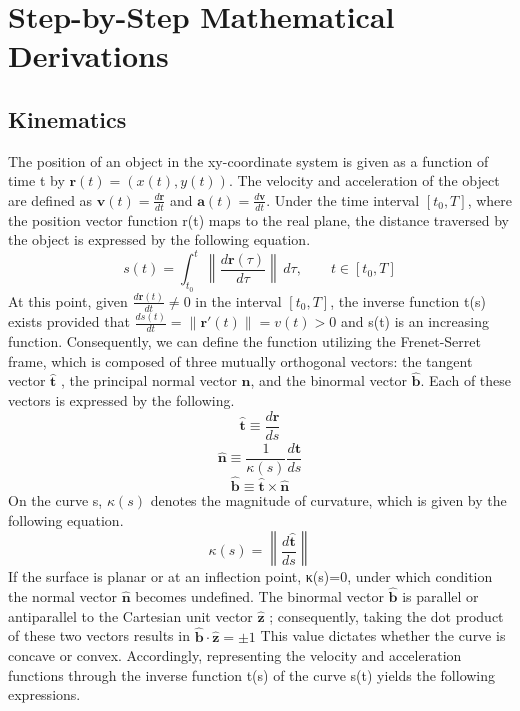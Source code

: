\documentclass[11pt,letterpaper]{article}
\begin{document}
\section{Step-by-Step Mathematical Derivations}
\subsection{Kinematics}
The position of an object in the xy-coordinate system is given as a function of time t by $\mathbf r(t)=(x(t),y(t))$. The velocity and acceleration of the object are defined as $\mathbf v(t)=\frac{d\mathbf r}{dt}$ and $\mathbf a(t)=\frac{d\mathbf v}{dt}$. Under the time interval $[t_0,T]$, where the position vector function r(t) maps to the real plane, the distance traversed by the object is expressed by the following equation.
\begin{equation}
s(t)
=
\int_{t_0}^{t}
\left\|
\frac{d\mathbf r(\tau)}{d\tau}
\right\|
\,d\tau,
\qquad
t\in[t_0,T]
\tag{1}
\end{equation}
At this point, given $\frac{d\mathbf r(t)}{dt}\neq0$ in the interval $[t_0,T]$, the inverse function t(s) exists provided that $\frac{ds(t)}{dt}=\left\|\mathbf r'(t)\right\|=v(t)>0$ and s(t) is an increasing function. Consequently, we can define the function utilizing the Frenet-Serret frame, which is composed of three mutually orthogonal vectors: the tangent vector $\hat{\mathbf t}$ , the principal normal vector $\hat{\mathbf n}$, and the binormal vector $\hat{\mathbf b}$. Each of these vectors is expressed by the following.
\begin{equation}
\hat{\mathbf t}
\equiv
\frac{d\mathbf r}{ds}
\tag{2a}
\end{equation} \begin{equation}
\hat{\mathbf n}
\equiv
\frac{1}{\kappa(s)}
\frac{d\hat{\mathbf t}}{ds}
\tag{2b}
\end{equation} \begin{equation}
\hat{\mathbf b}
\equiv
\hat{\mathbf t}\times\hat{\mathbf n}
\tag{2c}
\end{equation} On the curve s, $\kappa(s)$ denotes the magnitude of curvature, which is given by the following equation. \[
\kappa(s)
=
\left\|
\frac{d\hat{\mathbf t}}{ds}
\right\|
\] If the surface is planar or at an inflection point, κ(s)=0, under which condition the normal vector $\hat{\mathbf n}$ becomes undefined. The binormal vector $\hat{\mathbf b}$ is parallel or antiparallel to the Cartesian unit vector $\hat{\mathbf z}$ ; consequently, taking the dot product of these two vectors results in $\hat{\mathbf b}\cdot\hat{\mathbf z}=\pm1$ This value dictates whether the curve is concave or convex. Accordingly, representing the velocity and acceleration functions through the inverse function t(s) of the curve s(t) yields the following expressions.
\end{document}
